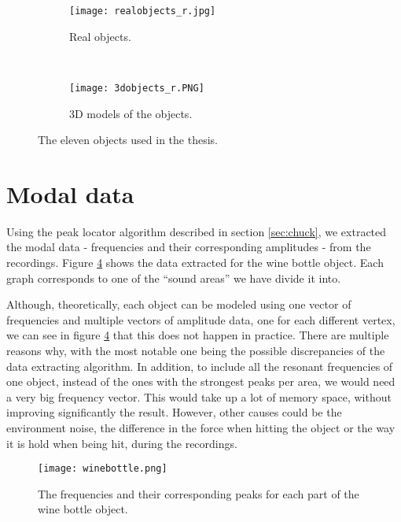 \begin{figure}[H]
    \centering
    \begin{subfigure}[b]{0.8\textwidth}
        \texttt{[image: realobjects\_r.jpg]}
        \caption{Real objects.}
        \label{fig:real}
    \end{subfigure}
    ~ %
    \begin{subfigure}[b]{0.8\textwidth}
        \texttt{[image: 3dobjects\_r.PNG]}
        \caption{3D models of the objects.}
        \label{fig:models}
    \end{subfigure}
    \caption{The eleven objects used in the thesis.}\label{fig:objects}
\end{figure}

\section{Modal data}
Using the peak locator algorithm described in section \ref{sec:chuck}, we extracted the modal data - frequencies and their corresponding amplitudes - from the recordings. Figure \ref{fig:bottle_data} shows the data extracted for the wine bottle object. Each graph corresponds to one of the ``sound areas'' we have divide it into.

Although, theoretically, each object can be modeled using one vector of frequencies and multiple vectors of amplitude data, one for each different vertex, we can see in figure \ref{fig:bottle_data} that this does not happen in practice. There are multiple reasons why, with the most notable one being the possible discrepancies of the data extracting algorithm. In addition, to include all the resonant frequencies of one object, instead of the ones with the strongest peaks per area, we would need a very big frequency vector. This would take up a lot of memory space, without improving significantly the result. However, other causes could be the environment noise, the difference in the force when hitting the object or the way it is hold when being hit, during the recordings.

\begin{figure}[H]
  \centering
    \texttt{[image: winebottle.png]}
      \caption{The frequencies and their corresponding peaks for each part of the wine bottle object.}\label{fig:bottle_data}
\end{figure}

